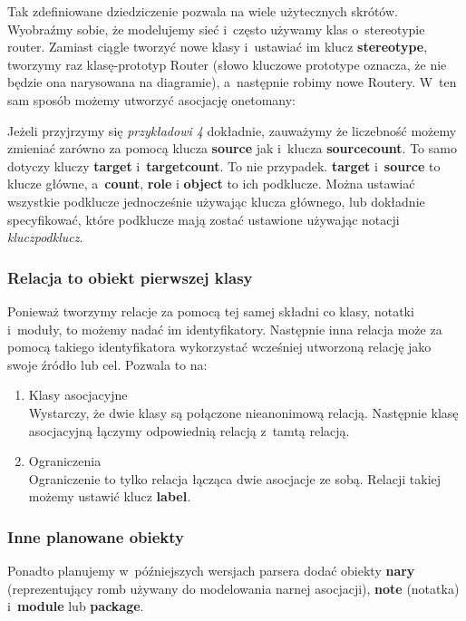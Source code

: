 \documentclass[a4paper,11pt,title]{report}
\begin{document}
Tak zdefiniowane dziedziczenie pozwala na wiele użytecznych skrótów. Wyobraźmy sobie, że modelujemy
sieć i~często używamy klas o~stereotypie router. Zamiast ciągle tworzyć nowe klasy i~ustawiać im
klucz \textbf{stereotype}, tworzymy raz klasę-prototyp Router (słowo kluczowe prototype oznacza, że nie będzie
ona narysowana na diagramie), a~następnie robimy nowe Routery. W~ten sam sposób możemy utworzyć
asocjację one\dywiz to\dywiz many:



Jeżeli przyjrzymy się \emph{przykładowi 4} dokładnie, zauważymy że liczebność możemy zmieniać
zarówno za pomocą klucza \textbf{source} jak i~klucza \textbf{source\dywiz count}. To samo dotyczy
kluczy \textbf{target} i~\textbf{target\dywiz count}. To nie przypadek. \textbf{target}
i~\textbf{source} to klucze główne, a~\textbf{count}, \textbf{role} i \textbf{object} to ich
podklucze. Można ustawiać wszystkie podklucze jednocześnie używając klucza głównego, lub dokładnie
specyfikować, które podklucze mają zostać ustawione używając notacji \emph{klucz\dywiz podklucz}.

\subsubsection{Relacja to obiekt pierwszej klasy}
Ponieważ tworzymy relacje za pomocą tej samej składni co klasy, notatki i~moduły, to możemy nadać im
identyfikatory. Następnie inna relacja może za pomocą takiego identyfikatora wykorzystać wcześniej
utworzoną relację jako swoje źródło lub cel. Pozwala to na:
\begin{enumerate}
  \item{Klasy asocjacyjne} \\
    Wystarczy, że dwie klasy są połączone nieanonimową relacją. Następnie klasę asocjacyjną łączymy
    odpowiednią relacją z~tamtą relacją.
  \item{Ograniczenia} \\
    Ograniczenie to tylko relacja łącząca dwie asocjacje ze sobą. Relacji takiej możemy ustawić
    klucz \textbf{label}.
\end{enumerate}

\subsubsection{Inne planowane obiekty}
Ponadto planujemy w~późniejszych wersjach parsera dodać obiekty \textbf{n\dywiz ary} (reprezentujący
romb używany do modelowania n\dywiz arnej asocjacji), \textbf{note} (notatka) i~\textbf{module} lub
\textbf{package}.
\end{document}
